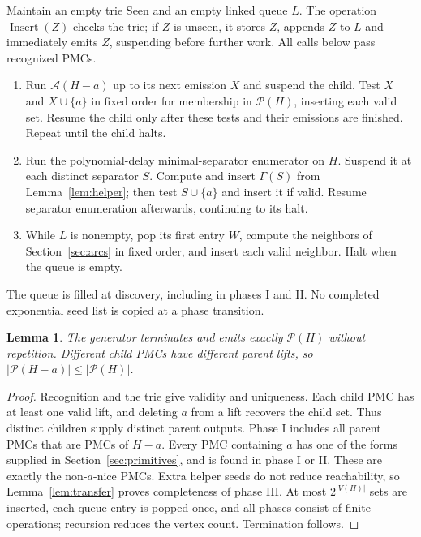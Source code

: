 \documentclass[acmsmall,12pt,screen,nonacm]{acmart}
\newtheorem{lemma}[theorem]{Lemma}
\newcommand{\PMC}{\mathcal P}
\newcommand{\Insert}{\operatorname{Insert}}
\begin{document}
Maintain an empty trie $\mathrm{Seen}$ and an empty linked queue $L$.
The operation $\Insert(Z)$ checks the trie; if $Z$ is unseen, it stores $Z$,
appends $Z$ to $L$ and immediately emits $Z$, suspending before further work.
All calls below pass recognized PMCs.
\begin{enumerate}
\item[\textbf{I.}] Run $\mathcal A(H-a)$ up to its next emission $X$ and
suspend the child. Test $X$ and $X\cup\{a\}$ in fixed order for membership
in $\PMC(H)$, inserting each valid set. Resume the child only after these
tests and their emissions are finished. Repeat until the child halts.
\item[\textbf{II.}] Run the polynomial-delay minimal-separator enumerator
on $H$. Suspend it at each distinct separator $S$. Compute and insert
$\Gamma(S)$ from Lemma~\ref{lem:helper}; then test $S\cup\{a\}$ and insert
it if valid. Resume separator enumeration afterwards, continuing to its halt.
\item[\textbf{III.}] While $L$ is nonempty, pop its first entry $W$,
compute the neighbors of Section~\ref{sec:arcs} in fixed order, and insert
each valid neighbor. Halt when the queue is empty.
\end{enumerate}
The queue is filled at discovery, including in phases I and II. No completed
exponential seed list is copied at a phase transition.

\begin{lemma}\label{lem:correct}
The generator terminates and emits exactly $\PMC(H)$ without repetition.
Different child PMCs have different parent lifts, so
$|\PMC(H-a)|\le |\PMC(H)|$.
\end{lemma}

\begin{proof}
Recognition and the trie give validity and uniqueness. Each child PMC has at
least one valid lift, and deleting $a$ from a lift recovers the child set.
Thus distinct children supply distinct parent outputs. Phase I includes
all parent PMCs that are PMCs of $H-a$. Every PMC containing $a$ has one
of the forms supplied in Section~\ref{sec:primitives}, and is found in
phase I or II. These are exactly the non-$a$-nice PMCs. Extra helper seeds
do not reduce reachability, so Lemma~\ref{lem:transfer} proves completeness
of phase III. At most $2^{|V(H)|}$ sets are inserted, each queue entry is
popped once, and all phases consist of finite operations; recursion reduces
the vertex count. Termination follows.
\end{proof}
\end{document}
